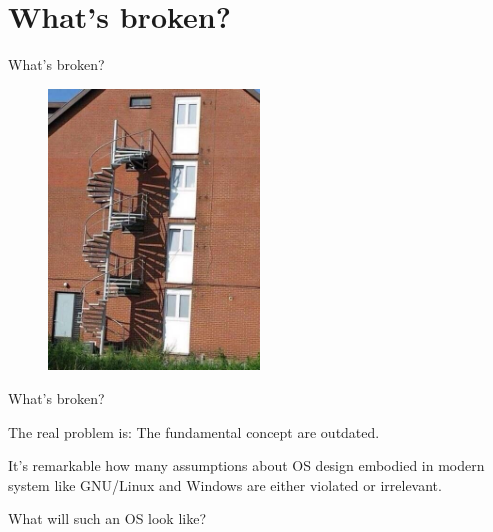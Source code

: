 \documentclass[10pt]{beamer}
\begin{document}
\section{What's broken?}
\begin{frame}{What's broken?}{}
  \begin{figure}[ht]
    \centering
    \includegraphics[width=0.5\textwidth, keepaspectratio=true]{images/whatsbroken.jpg}
  \end{figure}
\end{frame}
\begin{frame}{What's broken?}
  \begin{block}{}
    The real problem is: The fundamental concept are outdated.
  \end{block} \pause

  \begin{block}{}
    It's remarkable how many assumptions about OS design embodied in
    modern system like GNU/Linux and Windows are either violated or
    irrelevant.
  \end{block}

  \begin{block}{}
    What will such an OS look like?
  \end{block}
\end{frame}

\end{document}
